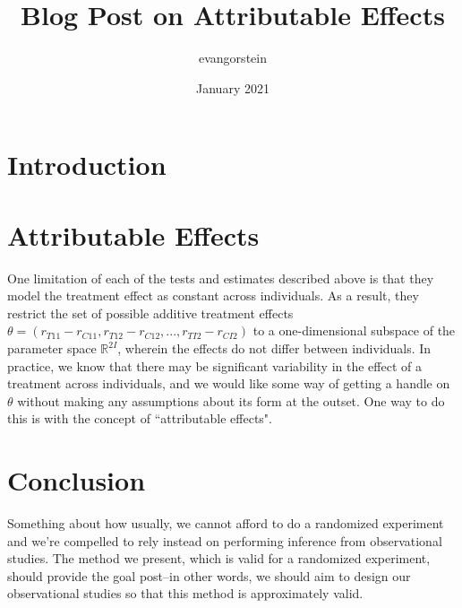 \documentclass{article}
\title{Blog Post on Attributable Effects}
\author{evangorstein }
\date{January 2021}
\begin{document}
\maketitle

\section{Introduction}



\section{Attributable Effects}

One limitation of each of the tests and estimates described above is that they model the treatment effect as constant across individuals. As a result, they restrict the set of possible additive treatment effects $\theta=(r_{T11}-r_{C11}, r_{T12}-r_{C12}, ... , r_{TI2}-r_{CI2})$ to a one-dimensional subspace of the parameter space $\mathbb{R}^{2I}$, wherein the effects do not differ between individuals. In practice, we know that there may be significant variability in the effect of a treatment across individuals, and we would like some way of getting a handle on $\theta$ without making any assumptions about its form at the outset. One way to do this is with the concept of ``attributable effects".



\section{Conclusion}

Something about how usually, we cannot afford to do a randomized experiment and we're compelled to rely instead on performing inference from observational studies. The method we present, which is valid for a randomized experiment, should provide the goal post--in other words, we should aim to design our observational studies so that this method is approximately valid. 
\end{document}
